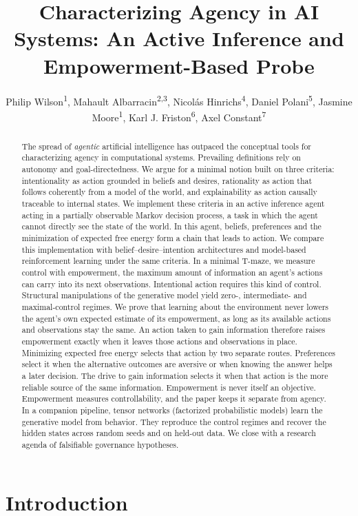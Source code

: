 \documentclass[letterpaper]{article} %
\title{Characterizing Agency in AI Systems: An Active Inference and Empowerment-Based Probe}
\author{
    Philip Wilson\textsuperscript{\rm 1},
    Mahault Albarracin\textsuperscript{\rm 2,\rm 3},
    Nicol\'{a}s Hinrichs\textsuperscript{\rm 4},
    Daniel Polani\textsuperscript{\rm 5},
    Jasmine Moore\textsuperscript{\rm 1},
    Karl J. Friston\textsuperscript{\rm 6},
    Axel Constant\textsuperscript{\rm 7}\corresponding
}
\theoremstyle{definition}
\begin{document}
\maketitle

\begin{abstract}
The spread of \emph{agentic} artificial intelligence has outpaced the conceptual tools for characterizing agency in computational systems. Prevailing definitions rely on autonomy and goal-directedness. We argue for a minimal notion built on three criteria: intentionality as action grounded in beliefs and desires, rationality as action that follows coherently from a model of the world, and explainability as action causally traceable to internal states. We implement these criteria in an active inference agent acting in a partially observable Markov decision process, a task in which the agent cannot directly see the state of the world. In this agent, beliefs, preferences and the minimization of expected free energy form a chain that leads to action. We compare this implementation with belief--desire--intention architectures and model-based reinforcement learning under the same criteria. In a minimal T-maze, we measure control with empowerment, the maximum amount of information an agent's actions can carry into its next observations. Intentional action requires this kind of control. Structural manipulations of the generative model yield zero-, intermediate- and maximal-control regimes. We prove that learning about the environment never lowers the agent's own expected estimate of its empowerment, as long as its available actions and observations stay the same. An action taken to gain information therefore raises empowerment exactly when it leaves those actions and observations in place. Minimizing expected free energy selects that action by two separate routes. Preferences select it when the alternative outcomes are aversive or when knowing the answer helps a later decision. The drive to gain information selects it when that action is the more reliable source of the same information. Empowerment is never itself an objective. Empowerment measures controllability, and the paper keeps it separate from agency. In a companion pipeline, tensor networks (factorized probabilistic models) learn the generative model from behavior. They reproduce the control regimes and recover the hidden states across random seeds and on held-out data. We close with a research agenda of falsifiable governance hypotheses.
\end{abstract}

\section{Introduction}\label{Introduction}
\end{document}

